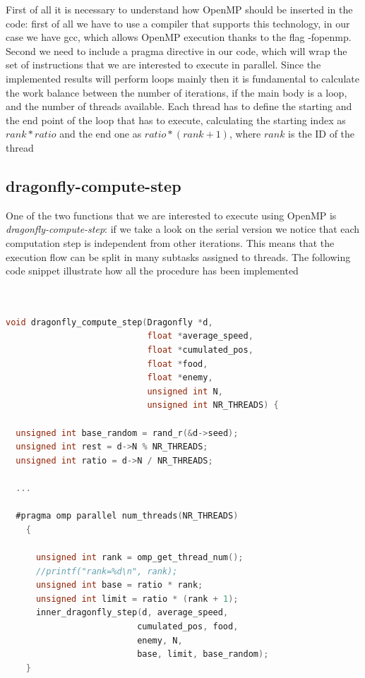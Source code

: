 \documentclass[10pt]{article}
\begin{document}
\begin{multicols}{2}
First of all it is necessary to understand how OpenMP should be inserted in the code: first of all we have to use 
a compiler that supports this technology, in our case we have gcc, which allows OpenMP execution thanks to the flag -fopenmp.
Second we need to include a pragma directive in our code, which will wrap the set of instructions that we are interested to execute
in parallel. Since the implemented results will perform loops mainly then it is fundamental to calculate the work balance between the number of iterations, if the main
body is a loop,
and the number of threads available. Each thread has to define the starting and the end point of the loop that has to execute,
calculating the starting index as $rank*ratio$ and the end one as $ratio*(rank+1)$, where $rank$ is the ID of the thread

\subsection*{dragonfly-compute-step}

One of the two functions that we are interested to execute using OpenMP is \textit{dragonfly-compute-step}:
if we take a look on the serial version we notice that each computation step is independent
from other iterations. This means that the execution flow can be split in many subtasks assigned
to threads. The following code snippet illustrate how all the procedure has been implemented
\begin{lstlisting}[language=C,caption={parallelized dragonfly-compute-step}]
  

void dragonfly_compute_step(Dragonfly *d, 
                            float *average_speed,
                            float *cumulated_pos, 
                            float *food, 
                            float *enemy, 
                            unsigned int N, 
                            unsigned int NR_THREADS) {

  unsigned int base_random = rand_r(&d->seed);
  unsigned int rest = d->N % NR_THREADS;
  unsigned int ratio = d->N / NR_THREADS;

  ...

  #pragma omp parallel num_threads(NR_THREADS)
    {
      
      unsigned int rank = omp_get_thread_num();
      //printf("rank=%d\n", rank);
      unsigned int base = ratio * rank;
      unsigned int limit = ratio * (rank + 1);
      inner_dragonfly_step(d, average_speed, 
                          cumulated_pos, food, 
                          enemy, N,
                          base, limit, base_random);
    }
  

\end{lstlisting}
\end{multicols}
\end{document}
